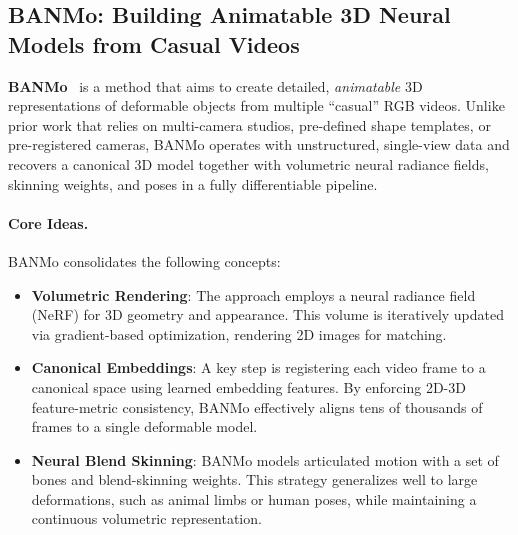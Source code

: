 \documentclass[11pt]{article}
\begin{document}
\subsection{BANMo: Building Animatable 3D Neural Models from Casual Videos}
\label{subsec:banmo}

\textbf{BANMo}~\cite{yang2022banmo} is a method that aims to create detailed, \emph{animatable} 3D representations of deformable objects from multiple ``casual'' RGB videos. Unlike prior work that relies on multi-camera studios, pre-defined shape templates, or pre-registered cameras, BANMo operates with unstructured, single-view data and recovers a canonical 3D model together with volumetric neural radiance fields, skinning weights, and poses in a fully differentiable pipeline.

\paragraph{Core Ideas.}
BANMo consolidates the following concepts:
\begin{itemize}
    \item \textbf{Volumetric Rendering}: The approach employs a neural radiance field (NeRF) for 3D geometry and appearance. This volume is iteratively updated via gradient-based optimization, rendering 2D images for matching.
    \item \textbf{Canonical Embeddings}: A key step is registering each video frame to a canonical space using learned embedding features. By enforcing 2D-3D feature-metric consistency, BANMo effectively aligns tens of thousands of frames to a single deformable model.
    \item \textbf{Neural Blend Skinning}: BANMo models articulated motion with a set of bones and blend-skinning weights. This strategy generalizes well to large deformations, such as animal limbs or human poses, while maintaining a continuous volumetric representation.
\end{itemize}
\end{document}
